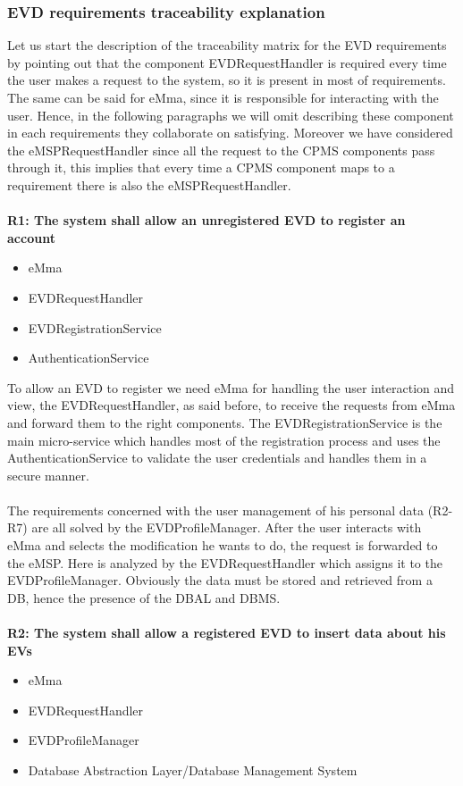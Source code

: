\subsubsection{EVD requirements traceability explanation}
Let us start the description of the traceability matrix for the EVD requirements by pointing out that the component EVDRequestHandler is required every time the user makes a request to the system, so it is present in most of  requirements. The same can be said for eMma, since it is responsible for interacting with the user. Hence, in the following paragraphs we will omit describing these component in each requirements they collaborate on satisfying. Moreover we have considered the eMSPRequestHandler since all the request to the CPMS components pass through it, this implies that every time a CPMS component maps to a requirement there is also the eMSPRequestHandler.\\
\\
\textbf{R1: The system shall allow an unregistered EVD to register an account}
\begin{itemize}
	\item eMma
	\item EVDRequestHandler
	\item EVDRegistrationService
	\item AuthenticationService
\end{itemize}
To allow an EVD to register we need eMma for handling the user interaction and view, the EVDRequestHandler, as said before, to receive the requests from eMma and forward them to the right components. The EVDRegistrationService is the main micro-service which handles most of the registration process and uses the AuthenticationService to validate the user credentials and handles them in a secure manner.\\
\\
The requirements concerned with the user management of his personal data (R2-R7) are all solved by the EVDProfileManager. After the user interacts with eMma and selects the modification he wants to do, the request is forwarded to the eMSP. Here is analyzed by the EVDRequestHandler which assigns it to the EVDProfileManager. Obviously the data must be stored and retrieved from a DB, hence the presence of the DBAL and DBMS.\\
\\
\textbf{R2: The system shall allow a registered EVD to insert data about his EVs}
\begin{itemize}
	\item eMma
	\item EVDRequestHandler
	\item EVDProfileManager
    \item Database Abstraction Layer/Database Management System
\end{itemize}
 
